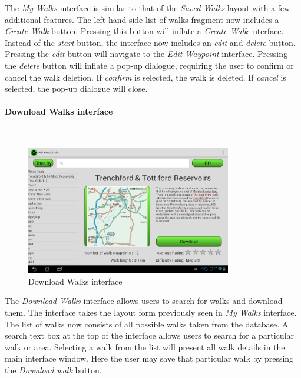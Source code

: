 \documentclass[11pt,a4paper]{report}
\begin{document}
The \emph{My Walks} interface is similar to that of the \emph{Saved Walks} layout with a few additional features. The left-hand side list of walks fragment now includes a \emph{Create Walk} button. Pressing this button will inflate a \emph{Create Walk} interface. Instead of the \emph{start} button, the interface now includes an \emph{edit} and \emph{delete} button. Pressing the \emph{edit} button will navigate to the \emph{Edit Waypoint} interface. Pressing the \emph{delete} button will inflate a pop-up dialogue, requiring the user to confirm or cancel the walk deletion. If \emph{confirm} is selected, the walk is deleted. If \emph{cancel} is selected, the pop-up dialogue will close.

\paragraph*{Download Walks interface}\mbox{}\\
\begin{figure}[H]
    \centering
    \includegraphics[width=0.8\textwidth]{chris/download_walk}
    \caption{Download Walks interface}
    \label{fig:download_walk}
\end{figure}

The \emph{Download Walks} interface allows users to search for walks and download them. The interface takes the layout form previously seen in \emph{My Walks} interface. The list of walks now consists of all possible walks taken from the database. A search text box at the top of the interface allows users to search for a particular walk or area. Selecting a walk from the list will present all walk details in the main interface window. Here the user may save that particular walk by pressing the \emph{Download walk} button.
\end{document}
